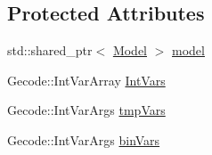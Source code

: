 \subsection*{Protected Attributes}
\begin{DoxyCompactItemize}
\item 
std\-::shared\-\_\-ptr$<$ \hyperlink{class_model}{Model} $>$ \hyperlink{class_gecode_solver_a76210bf2a7eda291bf319971c0285fad}{model}
\item 
Gecode\-::\-Int\-Var\-Array \hyperlink{class_gecode_solver_a17b5ac1b80ff807b0125ab423349a8a7}{Int\-Vars}
\item 
Gecode\-::\-Int\-Var\-Args \hyperlink{class_gecode_solver_a33b7c4b99d9be855c3275dad28b6a3e8}{tmp\-Vars}
\item 
Gecode\-::\-Int\-Var\-Args \hyperlink{class_gecode_solver_a73bb93a4cde21cd0fab60c73cf9cec0f}{bin\-Vars}
\end{DoxyCompactItemize}


